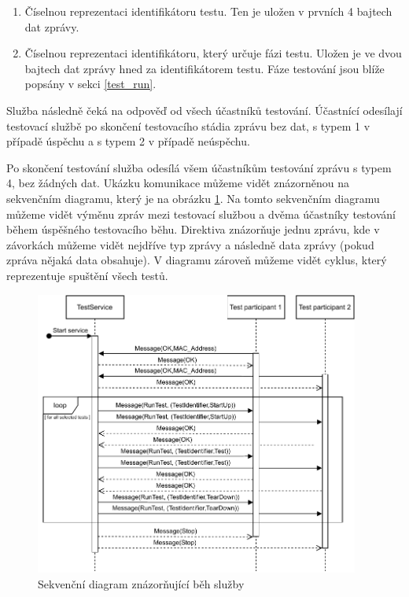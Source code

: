 \begin{enumerate}
    \item Číselnou reprezentaci identifikátoru testu. Ten je uložen v prvních 4 bajtech dat zprávy.
    \item Číselnou reprezentaci identifikátoru, který určuje fázi testu. Uložen je ve dvou bajtech dat zprávy hned za identifikátorem testu. Fáze testování jsou blíže popsány v sekci \ref{test_run}.
\end{enumerate}

Služba následně čeká na odpověď od všech účastníků testování. Účastnící odesílají testovací službě po skončení testovacího stádia zprávu bez dat, s typem 1 v případě úspěchu a s typem 2 v případě neúspěchu. 

Po skončení testování služba odesílá všem účastníkům testování zprávu s typem 4, bez žádných dat. Ukázku komunikace můžeme vidět znázorněnou na sekvenčním diagramu, který je na obrázku \ref{fig:seqdiag}. Na tomto sekvenčním diagramu můžeme vidět výměnu zpráv mezi testovací službou a dvěma účastníky testování během úspěšného testovacího běhu. Direktiva  znázorňuje jednu zprávu, kde v závorkách můžeme vidět nejdříve typ zprávy a následně data zprávy (pokud zpráva nějaká data obsahuje). V diagramu zároveň můžeme vidět cyklus, který reprezentuje spuštění všech testů.

\begin{figure}[htbp]
    \centering 
    \includegraphics[width=0.95\textwidth]{assets/img/sequencediagram.pdf}
    \caption{Sekvenční diagram znázorňující běh služby}
    \label{fig:seqdiag}
\end{figure}

